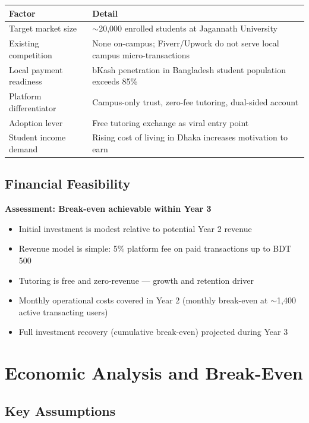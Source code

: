 \documentclass[a4paper,12pt]{article}
\begin{document}
\begin{table}[H]
\centering
\begin{tabular}{|l|p{8cm}|}
\hline
\textbf{Factor} & \textbf{Detail} \\
\hline
Target market size & $\sim$20,000 enrolled students at Jagannath University \\
Existing competition & None on-campus; Fiverr/Upwork do not serve local campus micro-transactions \\
Local payment readiness & bKash penetration in Bangladesh student population exceeds 85\% \\
Platform differentiator & Campus-only trust, zero-fee tutoring, dual-sided account \\
Adoption lever & Free tutoring exchange as viral entry point \\
Student income demand & Rising cost of living in Dhaka increases motivation to earn \\
\hline
\end{tabular}
\end{table}

\subsection{Financial Feasibility}
\textbf{Assessment: Break-even achievable within Year 3}

\begin{itemize}
    \item Initial investment is modest relative to potential Year 2 revenue
    \item Revenue model is simple: 5\% platform fee on paid transactions up to BDT 500
    \item Tutoring is free and zero-revenue --- growth and retention driver
    \item Monthly operational costs covered in Year 2 (monthly break-even at $\sim$1,400 active transacting users)
    \item Full investment recovery (cumulative break-even) projected during Year 3
\end{itemize}

\section{Economic Analysis and Break-Even}

\subsection{Key Assumptions}
\end{document}
